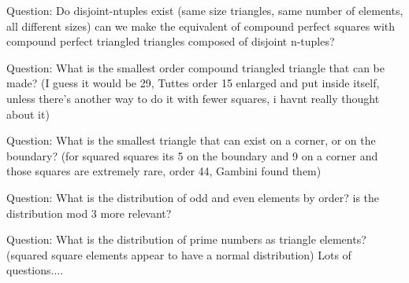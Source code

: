 \documentclass[12pt,amstags,fleqn]{article}
\theoremstyle{plain}
\theoremstyle{definition}
\begin{document}
\clearpage


Question: Do disjoint-ntuples exist (same size triangles, same number of
elements, all different sizes) can we make the equivalent of compound
perfect squares with compound perfect triangled triangles composed
of disjoint n-tuples?

Question: What is the smallest order compound triangled triangle that can
be made? (I guess it would be 29, Tuttes order 15 enlarged and put
inside itself, unless there's another way to do it with fewer squares,
i havnt really thought about it)

Question: What is the smallest triangle that can exist on a corner, or
on the boundary? (for squared squares its 5 on the boundary and 9
on a corner and those squares are extremely rare, order 44, Gambini
found them)


Question: What is the distribution of odd and even elements by order?
is the distribution mod 3 more relevant?

Question: What is the distribution of prime numbers as triangle elements?
(squared square elements appear to have a normal distribution) Lots
of questions....

\clearpage

%
%
\end{document}
